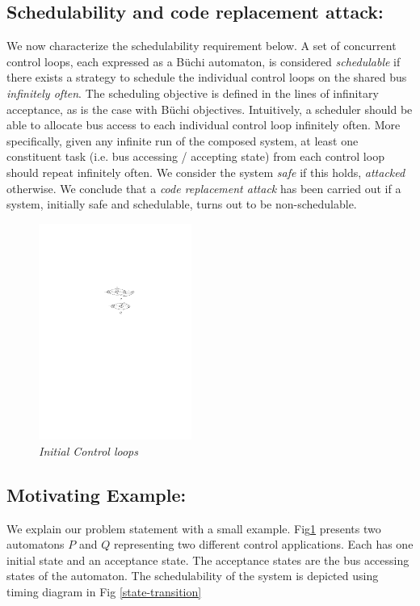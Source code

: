 \subsection{Schedulability and code replacement attack:} 
\noindent
We now characterize the schedulability requirement below. 
A set of concurrent control loops, each expressed as a B\"{u}chi automaton, is considered {\em schedulable} if there exists a strategy to schedule the individual control loops on the shared bus {\em infinitely often}.
The scheduling objective is defined in the lines of infinitary acceptance, as is the case with B\"{u}chi objectives. Intuitively, a scheduler should be able to allocate bus access to each individual control loop infinitely often. More specifically, given any infinite run of the composed system, at least one constituent task (i.e. bus accessing / accepting state) from each control loop should repeat infinitely often. We consider the system {\em safe} if this holds, {\em attacked} otherwise. We conclude that a {\em code replacement attack} has been carried out if a system,  initially safe and schedulable, turns out to be non-schedulable. 

\begin{figure}
\begin{center}
\includegraphics[width=50mm]{motivating_example_automata.pdf}
\end{center}
\caption{{\em Initial Control loops}}
\label{state}
\end{figure}

\subsection{Motivating Example:}
\noindent
We explain our problem statement with a small example. Fig\ref{state} presents two automatons $P$ and $Q$  representing two different control applications.
Each has one initial state and an acceptance state. The acceptance states are the bus accessing states
of the automaton. The  schedulability of the system is depicted using timing diagram in Fig \ref{state-transition}

